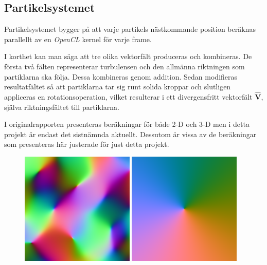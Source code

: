 \documentclass[a4paper]{article}
\begin{document}
\begin{multicols}{2}
    \vspace{-0.35cm}
    \subsection{Partikelsystemet} \label{sec:partikelsystemet}

    Partikelsystemet bygger på att varje partikels nästkommande position beräknas parallellt av en \textit{OpenCL} kernel för varje frame. 

    I korthet kan man säga att tre olika vektorfält produceras och kombineras. De första två fälten representerar turbulensen och den allmänna riktningen som partiklarna ska följa. Dessa kombineras genom addition. Sedan modifieras resultatfältet så att partiklarna tar sig runt solida kroppar och slutligen appliceras en rotationsoperation, vilket resulterar i ett divergensfritt vektorfält \(\hat{\mathbf{V}}\), själva riktningsfältet till partiklarna.

    I originalrapporten presenteras beräkningar för både 2-D och 3-D men i detta projekt är endast det sistnämnda aktuellt. Dessutom är vissa av de beräkningar som presenteras här justerade för just detta projekt.

\begin{figure}[H]
\begin{minipage}[]{0.5\textwidth}
\center
\includegraphics[width=0.48\textwidth]{share/Noise_downscale.png}
\includegraphics[width=0.48\textwidth]{share/Background_downscale.png}


\end{minipage}
\end{figure}
\end{multicols}
\end{document}
